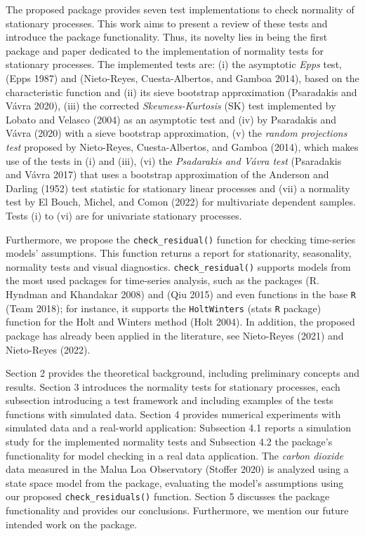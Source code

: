 The proposed  package provides seven test implementations to check normality of stationary processes. This work aims to present a review of these tests and introduce the package functionality. Thus, its novelty lies in being the first package and paper dedicated to the implementation of normality tests for stationary processes. The implemented tests are: (i) the asymptotic \emph{Epps} test, (Epps 1987) and (Nieto-Reyes, Cuesta-Albertos, and Gamboa 2014), based on the characteristic function and (ii) its sieve bootstrap approximation (Psaradakis and Vávra 2020), (iii) the corrected \emph{Skewness-Kurtosis} (SK) test implemented by Lobato and Velasco (2004) as an asymptotic test and (iv) by Psaradakis and Vávra (2020) with a sieve bootstrap approximation, (v) the \emph{random projections test} proposed by Nieto-Reyes, Cuesta-Albertos, and Gamboa (2014), which makes use of the tests in (i) and (iii), (vi) the \emph{Psadarakis and Vávra test} (Psaradakis and Vávra 2017) that uses a bootstrap approximation of the Anderson and Darling (1952) test statistic for stationary linear processes and (vii) a normality test by El Bouch, Michel, and Comon (2022) for multivariate dependent samples. Tests (i) to (vi) are for univariate stationary processes.

Furthermore, we propose the \texttt{check\_residual()} function for checking time-series models' assumptions. This function returns a report for stationarity, seasonality, normality tests and visual diagnostics. \texttt{check\_residual()} supports models from the most used packages for time-series analysis, such as the packages  (R. Hyndman and Khandakar 2008) and  (Qiu 2015) and even functions in the base \texttt{R} (Team 2018); for instance, it supports the \texttt{HoltWinters} (stats \texttt{R} package) function for the Holt and Winters method (Holt 2004). In addition, the proposed  package has already been applied in the literature, see Nieto-Reyes (2021) and Nieto-Reyes (2022).

Section 2 provides the theoretical background, including preliminary concepts and results. Section 3 introduces the normality tests for stationary processes, each subsection introducing a test framework and including examples of the tests functions with simulated data. Section 4 provides numerical experiments with simulated data and a real-world application: Subsection 4.1 reports a simulation study for the implemented normality tests and Subsection 4.2 the package's functionality for model checking in a real data application. The \emph{carbon dioxide} data measured in the Malua Loa Observatory (Stoffer 2020) is analyzed using a state space model from the  package, evaluating the model's assumptions using our proposed \texttt{check\_residuals()} function. Section 5 discusses the package functionality and provides our conclusions. Furthermore, we mention our future intended work on the package.

